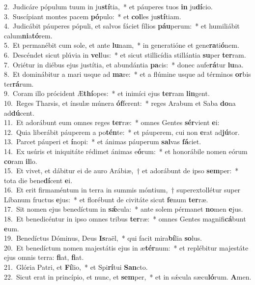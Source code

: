 {2.~}Judicáre pópulum tuum in ju\textbf{stí}tia,~* et páuperes tuos \textbf{in} ju\textbf{dí}cio.\\
{3.~}Suscípiant montes pacem \textbf{pó}pulo:~* et \textbf{col}les ju\textbf{stí}tiam.\\
{4.~}Judicábit páuperes pópuli, et salvos fáciet fílios \textbf{páu}perum:~* et humiliábit calum\textbf{ni}a\textbf{tó}rem.\\
{5.~}Et permanébit cum sole, et ante \textbf{lu}nam,~* in generatióne et gene\textbf{ra}ti\textbf{ó}nem.\\
{6.~}Descéndet sicut plúvia in \textbf{vel}lus:~* et sicut stillicídia stillántia \textbf{su}per \textbf{ter}ram.\\
{7.~}Oriétur in diébus ejus justítia, et abundántia \textbf{pa}cis:~* donec aufe\textbf{rá}tur \textbf{lu}na.\\
{8.~}Et dominábitur a mari usque ad \textbf{ma}re:~* et a flúmine usque ad términos \textbf{or}bis ter\textbf{rá}rum.\\
{9.~}Coram illo prócident Æ\textbf{thí}opes:~* et inimíci ejus \textbf{ter}ram \textbf{lin}gent.\\
{10.~}Reges Tharsis, et ínsulæ múnera \textbf{óf}ferent:~* reges Arabum et Saba \textbf{do}na ad\textbf{dú}cent.\\
{11.~}Et adorábunt eum omnes reges \textbf{ter}ræ:~* omnes Gentes \textbf{sér}vient \textbf{e}i:\\
{12.~}Quia liberábit páuperem a po\textbf{tén}te:~* et páuperem, cui non \textbf{e}rat ad\textbf{jú}tor.\\
{13.~}Parcet páuperi et \textbf{í}nopi:~* et ánimas páuperum \textbf{sal}vas \textbf{fá}ciet.\\
{14.~}Ex usúris et iniquitáte rédimet ánimas e\textbf{ó}rum:~* et honorábile nomen eórum \textbf{co}ram \textbf{il}lo.\\
{15.~}Et vivet, et dábitur ei de auro Arábiæ,~† et adorábunt de ipso \textbf{sem}per:~* tota die bene\textbf{dí}cent \textbf{e}i.\\
{16.~}Et erit firmaméntum in terra in summis móntium,~† superextollétur super Líbanum fructus \textbf{e}jus:~* et florébunt de civitáte sicut \textbf{fe}num \textbf{ter}ræ.\\
{17.~}Sit nomen ejus benedíctum in \textbf{sǽ}cula:~* ante solem pérmanet \textbf{no}men \textbf{e}jus.\\
{18.~}Et benedicéntur in ipso omnes tribus \textbf{ter}ræ:~* omnes Gentes magnifi\textbf{cá}bunt \textbf{e}um.\\
{19.~}Benedíctus Dóminus, Deus \textbf{Is}raël,~* qui facit mira\textbf{bí}lia \textbf{so}lus.\\
{20.~}Et benedíctum nomen majestátis ejus in æ\textbf{tér}num:~* et replébitur majestáte ejus omnis terra: \textbf{fi}at, \textbf{fi}at.\\
{21.~}Glória Patri, et \textbf{Fí}lio,~* et Spi\textbf{rí}tui \textbf{San}cto.\\
{22.~}Sicut erat in princípio, et nunc, et \textbf{sem}per,~* et in sǽcula sæcu\textbf{ló}rum. \textbf{A}men.\\
